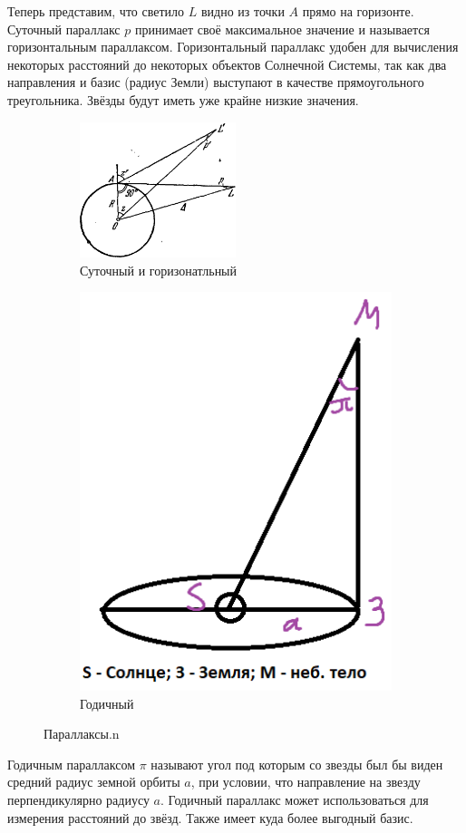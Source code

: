 \documentclass[16pt,a4paper]{report}
\begin{document}
Теперь представим, что светило $L$ видно из точки $A$ прямо на горизонте. Суточный параллакс $p$ принимает своё максимальное значение и называется горизонтальным параллаксом.
Горизонтальный параллакс удобен для вычисления некоторых расстояний до некоторых объектов Солнечной Системы, так как два направления и базис (радиус Земли) выступают в качестве прямоугольного треугольника. Звёзды будут иметь уже крайне низкие значения.
\begin{figure}[H]
    \centering
    \begin{subfigure}{0.4\textwidth}
        \centering
        \includegraphics[width=0.5\textwidth]{sutochny_horiz_parallaks.png}
        \caption{Суточный и горизонатльный}
        \label{fig:first}
    \end{subfigure}    
    \qquad
    \begin{subfigure}{0.4\textwidth}
        \centering
        \includegraphics[width=0.3 \textwidth]{godychny_changed_parallaks.png}
        \caption{Годичный}
        \label{fig:second}
    \end{subfigure}    
    \caption{Параллаксы.n}
    \label{fig:enter-label}
\end{figure}




Годичным параллаксом $\pi$ называют угол под которым со звезды был бы виден средний радиус земной орбиты $a$, при условии, что направление на звезду перпендикулярно радиусу $a$.
Годичный параллакс может использоваться для измерения расстояний до звёзд. Также имеет куда более выгодный базис. 
\end{document}
